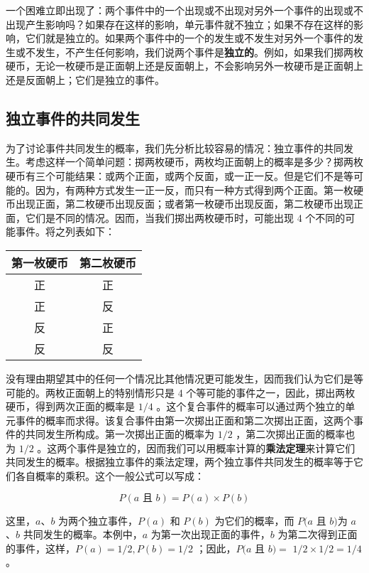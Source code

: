 一个困难立即出现了：两个事件中的一个出现或不出现对另外一个事件的出现或不出现产生影响吗？如果存在这样的影响，单元事件就不独立；如果不存在这样的影响，它们就是独立的。如果两个事件中的一个的发生或不发生对另外一个事件的发生或不发生，不产生任何影响，我们说两个事件是\textbf{独立的}。例如，如果我们掷两枚硬币，无论一枚硬币是正面朝上还是反面朝上，不会影响另外一枚硬币是正面朝上还是反面朝上；它们是独立的事件。

\subsection{独立事件的共同发生}

为了讨论事件共同发生的概率，我们先分析比较容易的情况：独立事件的共同发生。考虑这样一个简单问题：掷两枚硬币，两枚均正面朝上的概率是多少？掷两枚硬币有三个可能结果：或两个正面，或两个反面，或一正一反。但是它们不是等可能的。因为，有两种方式发生一正一反，而只有一种方式得到两个正面。第一枚硬币出现正面，第二枚硬币出现反面；或者第一枚硬币出现反面，第二枚硬币出现正面，它们是不同的情况。因而，当我们掷出两枚硬币时，可能出现 4 个不同的可能事件。将之列表如下：

\begin{center}
\begin{tabular}{|c|c|}
\hline
\textbf{第一枚硬币} & \textbf{第二枚硬币} \\
\hline
正 & 正 \\
正 & 反 \\
反 & 正 \\
反 & 反 \\
\hline
\end{tabular}
\end{center}

没有理由期望其中的任何一个情况比其他情况更可能发生，因而我们认为它们是等可能的。两枚正面朝上的特别情形只是 4 个等可能的事件之一，因此，掷出两枚硬币，得到两次正面的概率是 $1 / 4$ 。这个复合事件的概率可以通过两个独立的单元事件的概率而求得。该复合事件由第一次掷出正面和第二次掷出正面，这两个事件的共同发生所构成。第一次掷出正面的概率为 $1 / 2$ ，第二次掷出正面的概率也为 $1 / 2$ 。这两个事件是独立的，因而我们可以用概率计算的\textbf{乘法定理}来计算它们共同发生的概率。根据独立事件的乘法定理，两个独立事件共同发生的概率等于它们各自概率的乘积。这个一般公式可以写成：

$$
P(a \text { 且 } b)=P(a) \times P(b)
$$

这里，$a$、$b$ 为两个独立事件，$P(a)$ 和 $P(b)$ 为它们的概率，而 $P(a$ 且 $b)$为 $a$、$b$ 共同发生的概率。本例中，$a$ 为第一次出现正面的事件，$b$ 为第二次得到正面的事件，这样，$P(a)=1 / 2, P(b)=1 / 2$ ；因此，$P(a$ 且 $b)=$ $1 / 2 \times 1 / 2=1 / 4$ 。

